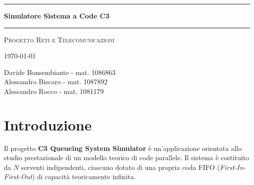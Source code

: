 \documentclass[12pt,a4paper]{article}
\begin{document}
\begin{titlepage}
  \thispagestyle{empty}
  \begin{center}
    \vspace*{4cm}

    {\color{rulecolor}\rule{\linewidth}{0.6pt}}
    \vspace{1.2em}

    {\LARGE\bfseries\color{titlecolor}
      Simulatore Sistema a Code C3}

    \vspace{1.2em}
    {\color{rulecolor}\rule{\linewidth}{0.6pt}}

    \vspace{2.5cm}

    {\normalsize\scshape\color{titlecolor} Progetto Reti e Telecomunicazioni}

    \vspace{0.5cm}
    {\small\color{muted} \today}

    \vfill

    \begin{tcolorbox}[
        enhanced,
        colback=boxbg,
        colframe=boxframe,
        arc=2pt,
        boxrule=0.5pt,
        left=14pt, right=14pt, top=9pt, bottom=9pt,
        width=0.70\textwidth
      ]
      \centering\small\color{muted}
      Davide Bonsembiante - mat. 1086863 \\
      Alessandro Biscaro - mat. 1087892 \\
      Alessandro Rocco - mat. 1081179
    \end{tcolorbox}

    \vspace{2cm}
  \end{center}
\end{titlepage}

\newpage
\tableofcontents
\newpage


\section{Introduzione}


Il progetto \textbf{C3 Queueing System Simulator} è un'applicazione orientata allo studio prestazionale di un modello teorico di code parallele. Il sistema è costituito da $N$ serventi indipendenti, ciascuno dotato di una propria coda \textsc{FIFO} (\textit{First-In-First-Out}) di capacità teoricamente infinita.
\end{document}
